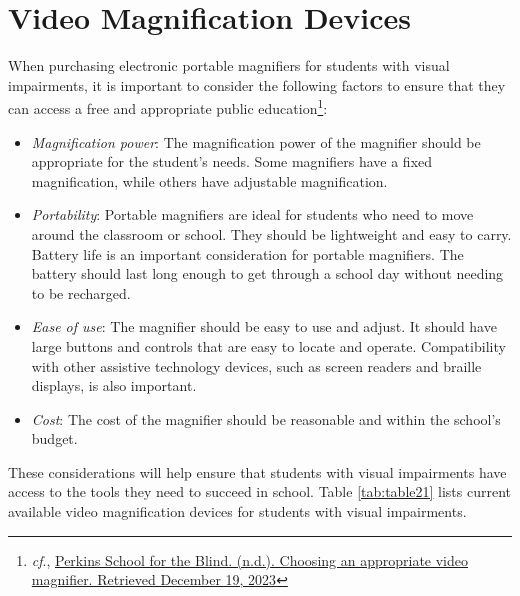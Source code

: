 \section{Video Magnification Devices}\label{video-magnification-devices}

When purchasing electronic portable magnifiers for students with visual impairments, it is important to consider the following factors to ensure that they can access a free and appropriate public education\footnote{\emph{cf}., \href{http://www.perkins.org/resource/choosing-appropriate-video-magnifier/}{Perkins School for the Blind. (n.d.). Choosing an appropriate video magnifier. Retrieved December 19, 2023}}:
\begin{itemize}
 \item \emph{Magnification power}: The magnification power of the magnifier should be appropriate for the student’s needs. Some magnifiers have a fixed magnification, while others have adjustable magnification.
 \item \emph{Portability}: Portable magnifiers are ideal for students who need to move around the classroom or school. They should be lightweight and easy to carry. Battery life is an important consideration for portable magnifiers. The battery should last long enough to get through a school day without needing to be recharged.
 \item \emph{Ease of use}: The magnifier should be easy to use and adjust. It should have large buttons and controls that are easy to locate and operate. Compatibility with other assistive technology devices, such as screen readers and braille displays, is also important.
 \item \emph{Cost}: The cost of the magnifier should be reasonable and within the school’s budget.
\end{itemize}
These considerations will help ensure that students with visual impairments have access to the tools they need to succeed in school. Table \ref{tab:table21} lists current available video magnification devices for students with visual impairments.

